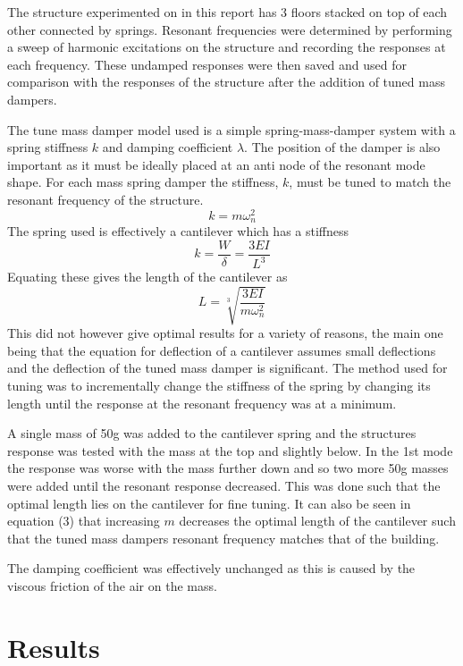 \documentclass[9pt]{article}
\begin{document}
The structure experimented on in this report has 3 floors stacked on top of each other connected by springs.
Resonant frequencies were determined by performing a sweep of harmonic excitations on the structure and recording the responses at each frequency.
These undamped responses were then saved and used for comparison with the responses of the structure after the addition of tuned mass dampers.

The tune mass damper model used is a simple spring-mass-damper system with a spring stiffness $k$ and damping coefficient $\lambda$.
The position of the damper is also important as it must be ideally placed at an anti node of the resonant mode shape.
For each mass spring damper the stiffness, $k$, must be tuned to match the resonant frequency of the structure.
\begin{equation}
    k = m\omega_n^2
\end{equation}
The spring used is effectively a cantilever which has a stiffness
\begin{equation}
    k = \frac{W}{\delta} = \frac{3EI}{L^3}
\end{equation}
Equating these gives the length of the cantilever as
\begin{equation}
    L = \sqrt[3]{\frac{3EI}{m\omega_n^2}}
\end{equation}
This did not however give optimal results for a variety of reasons, the main one being that the equation for deflection
of a cantilever assumes small deflections and the deflection of the tuned mass damper is significant.
The method used for tuning was to incrementally change the stiffness of the spring by changing its length until the response 
at the resonant frequency was at a minimum. 

A single mass of 50g was added to the cantilever spring and the structures response was tested with the mass at the top and slightly below.
In the 1st mode the response was worse with the mass further down and so two more 50g masses were added until the resonant response decreased.
This was done such that the optimal length lies on the cantilever for fine tuning. It can also be seen in equation (3) that increasing $m$
decreases the optimal length of the cantilever such that the tuned mass dampers resonant frequency matches that of the building.

The damping coefficient was effectively unchanged as this is caused by the viscous friction of the air on the mass.

\newpage

\section{Results}
\end{document}

